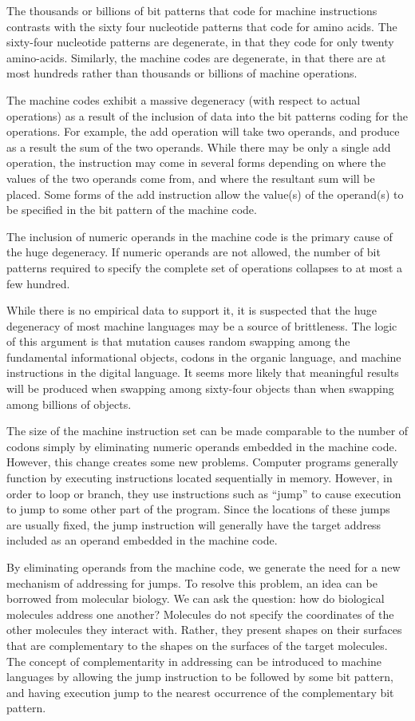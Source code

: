 The thousands or billions of bit patterns that code for machine
instructions contrasts with the sixty four nucleotide patterns that
code for amino acids.  The sixty-four nucleotide patterns are degenerate,
in that they code for only twenty amino-acids.  Similarly, the machine
codes are degenerate, in that there are at most hundreds rather than
thousands or billions of machine operations.

The machine codes exhibit a massive degeneracy (with respect to
actual operations) as a result of the inclusion of data into the
bit patterns coding for the operations.  For example, the add
operation will take two operands, and produce as a result the sum
of the two operands.  While there may be only a single add operation,
the instruction may come in several forms depending on where the
values of the two operands come from, and where the resultant sum
will be placed.  Some forms of the add instruction allow the
value(s) of the operand(s) to be specified in the bit pattern of
the machine code.

The inclusion of numeric operands in the machine code is the primary
cause of the huge degeneracy.  If numeric operands are not allowed,
the number of bit patterns required to specify the complete set of
operations collapses to at most a few hundred.

While there is no empirical data to support it, it is suspected that
the huge degeneracy of most machine languages may be a source of
brittleness.  The logic of this argument is that mutation causes
random swapping among the fundamental informational objects, codons
in the organic language, and machine instructions in the digital
language.  It seems more likely that meaningful results will be
produced when swapping among sixty-four objects than when swapping
among billions of objects.

The size of the machine instruction set can be made comparable to
the number of codons simply by eliminating numeric operands embedded
in the machine code.  However, this change creates some new problems.
Computer programs generally function by executing instructions located
sequentially in memory.  However, in order to loop or branch, they
use instructions such as ``jump'' to cause execution to jump to some
other part of the program.  Since the locations of these jumps are
usually fixed, the jump instruction will generally have the target
address included as an operand embedded in the machine code.

By eliminating operands from the machine code, we generate the need
for a new mechanism of addressing for jumps.  To resolve this problem,
an idea can be borrowed from molecular biology.  We can ask the
question: how do biological molecules address one another?  Molecules
do not specify the coordinates of the other molecules they
interact with.  Rather, they present shapes on their surfaces that are
complementary to the shapes on the surfaces of the target molecules.
The concept of complementarity in addressing can be introduced to
machine languages by allowing the jump instruction to be followed by
some bit pattern, and having execution jump to the nearest occurrence
of the complementary bit pattern.

